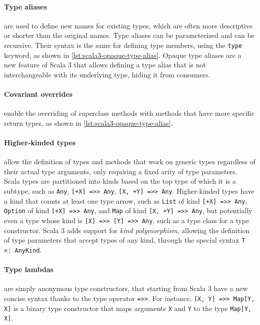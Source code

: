 \paragraph{Type aliases} are used to define new names for existing types, which are often more descriptive or shorter than the original names.
%
Type aliases can be parameterized and can be recursive.
%
Their syntax is the same for defining type members, using the \texttt{type} keyword, as shown in \cref{lst:scala3-opaque-type-alias}.
%
Opaque type aliases are a new feature of Scala 3 that allows defining a type alias that is not interchangeable with its underlying type, hiding it from consumers.



\paragraph{Covariant overrides} enable the overriding of superclass methods with methods that have more specific return types, as shown in \cref{lst:scala3-opaque-type-alias}.

\paragraph{Higher-kinded types} allow the definition of types and methods that work on generic types regardless of their actual type arguments, only requiring a fixed arity of type parameters.
%
Scala types are partitioned into kinds based on the top type of which it is a subtype, such as \texttt{Any}, \texttt{[+X] =>> Any}, \texttt{[X, +Y] =>> Any}.
%
Higher-kinded types have a kind that counts at least one type arrow, such as \texttt{List} of kind \texttt{[+X] =>> Any}, \texttt{Option} of kind \texttt{[+X] =>> Any}, and \texttt{Map} of kind \texttt{[X, +Y] =>> Any}, but potentially even a type whose kind is \texttt{[X] =>> [Y] =>> Any}, such as a type class for a type constructor.
%
Scala 3 adds support for \textit{kind polymorphism}, allowing the definition of type parameters that accept types of any kind, through the special syntax \texttt{T <: AnyKind}.

\paragraph{Type lambdas} are simply anonymous type constructors, that starting from Scala 3 have a new concise syntax thanks to the type operator \texttt{=>>}.
%
For instance, \texttt{[X, Y] =>> Map[Y, X]} is a binary type constructor that maps arguments \texttt{X} and \texttt{Y} to the type \texttt{Map[Y, X]}.

